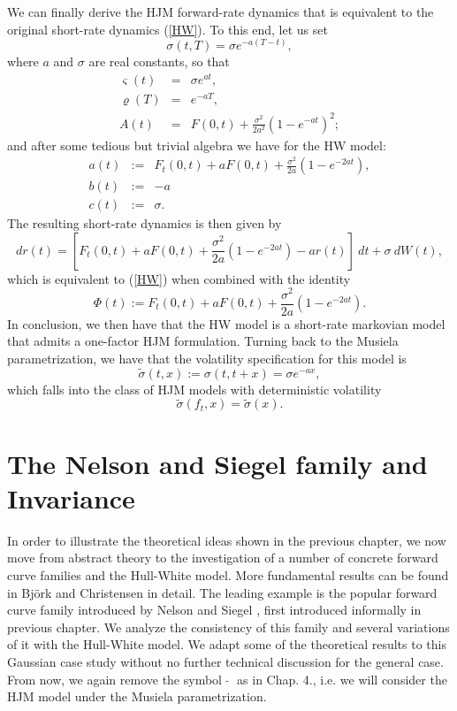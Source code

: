 We can finally derive the HJM forward-rate dynamics that is equivalent
to the original short-rate dynamics (\ref{HW}). To this end, let us
set
$$
\sigma(t,T)=\sigma e^{-a (T-t)},
$$
where $a$ and $\sigma$ are real constants, so that
\begin{equation}
\label{defHWHJM}
\begin{array}{rcl}
\varsigma(t)&=&\sigma e^{a t},\\
\varrho(T)&=&e^{-a T},\\
A(t)&=&F(0,t)+\frac{\sigma^2}{2 a^2}(1-e^{-a t})^2;
\end{array}
\end{equation}
and after some tedious but trivial algebra we have for the HW model:
 \begin{equation}
\begin{array}{rcl}
  a(t) &:=& F_t(0,t) +a F(0,t)+\displaystyle\frac{\sigma^2}{2a}(1-e^{-2 a t}),\\ 
b(t) &:=& -a\\
c(t) &:=& \sigma.
\end{array}
\end{equation}
The resulting short-rate dynamics is then given by
\begin{equation}
\label{HWfinal}
dr(t)=\left[F_t(0,t)+aF(0,t)+\displaystyle\frac{\sigma^2}{2a}(1-e^{-2
    a t}) -a r(t)\right]\: dt+\sigma\: dW(t),
\end{equation}
which is equivalent to (\ref{HW}) when combined with the identity
$$
\Phi(t):=F_t(0,t)+a F(0,t)+\displaystyle\frac{\sigma^2}{2a}(1-e^{-2 a t}).
$$
In conclusion, we then have that the HW model is a short-rate
markovian model that admits a one-factor HJM formulation. Turning back
to the Musiela parametrization, we have that the volatility
specification for this model is \begin{equation}
\label{volHWHJMM}
\widetilde\sigma(t,x):=\sigma(t,t+x)=\sigma e^{-a x},
\end{equation}
which falls into the class of HJM models with deterministic
volatility $$\widetilde\sigma(f_t,x)=\widetilde\sigma(x).$$ 
\section{The Nelson and Siegel family and Invariance}
In order to illustrate the theoretical ideas shown in the previous
chapter, we now move from abstract theory to the investigation of a
number of concrete forward curve families and the Hull-White
model. More fundamental results can be found in Bj\"ork and
Christensen \cite{BC:1999} in detail. The leading example is the
popular forward curve family introduced by Nelson and Siegel
\cite{NS:1987}, first introduced informally in previous chapter. We
analyze the consistency of this family and several variations of it
with the Hull-White model. We adapt some of the theoretical results to
this Gaussian case study without no further technical discussion for
the general case. From now, we again remove the symbol
$\;\widetilde{}\;$ as in Chap. 4., i.e. we will consider the HJM model 
under the Musiela parametrization. 

